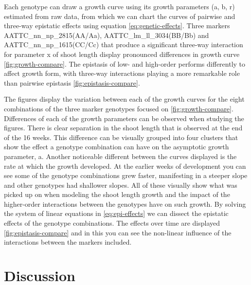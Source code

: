 \documentclass[11pt,]{book}
\theoremstyle{definition}
\theoremstyle{definition}
\theoremstyle{remark}
\begin{document}
Each genotype can draw a growth curve using its growth parameters (a, b,
r) estimated from raw data, from which we can chart the curves of
pairwise and three-way epistatic effects using equation
\eqref{eq:genetic-effects}. Three markers AATTC\_nn\_np\_2815(AA/Aa),
AATTC\_lm\_ll\_3034(BB/Bb) and AATTC\_nn\_np\_1615(CC/Cc) that produce a
significant three-way interaction for parameter x of shoot length
display pronounced differences in growth curve \ref{fig:growth-compare}.
The epistasis of low- and high-order performs differently to affect
growth form, with three-way interactions playing a more remarkable role
than pairwise epistasis \ref{fig:epistasis-compare}.

The figures display the variation between each of the growth curves for
the eight combinations of the three marker genotypes focused on
\ref{fig:growth-compare}. Differences of each of the growth parameters
can be observed when studying the figures. There is clear separation in
the shoot length that is observed at the end of the 16 weeks. This
difference can be visually grouped into four clusters that show the
effect a genotype combination can have on the asymptotic growth
parameter, a. Another noticeable different between the curves displayed
is the rate at which the growth developed. At the earlier weeks of
development you can see some of the genotype combinations grew faster,
manifesting in a steeper slope and other genotypes had shallower slopes.
All of these visually show what was picked up on when modeling the shoot
length growth and the impact of the higher-order interactions between
the genotypes have on such growth. By solving the system of linear
equations in \eqref{eq:epi-effects} we can dissect the epistatic effects
of the genotype combinations. The effects over time are displayed
\ref{fig:epistasis-compare} and in this you can see the non-linear
influence of the interactions between the markers included.

\section{Discussion}\label{discussion-1}
\end{document}
